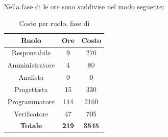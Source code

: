 \subsection{\Cod}
Nella fase di \Cod{} le ore sono suddivise nel modo seguente:
\begin{table}[H]
	\centering
	\begin{tabular}{|c|c|c|}
		\hline
		\textbf{Ruolo} &
		\textbf{Ore} &
		\textbf{Costo} \\
		\hline
		Responsabile & 9 & 270 \\
		\hline
		Amministratore & 4 & 80 \\
		\hline
		Analista & 0 & 0\\
		\hline
		Progettista & 15 & 330 \\
		\hline
		Programmatore & 144 & 2160 \\
		\hline
		Verificatore & 47 & 705 \\
		\hline
		\textbf{Totale} & \textbf{219} & \textbf{3545} \\
		\hline
	\end{tabular}
	\caption{Costo per ruolo, fase di \Cod}
\end{table}

